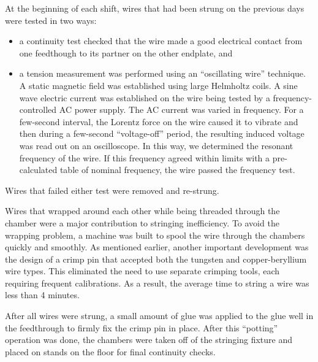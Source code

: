 At the beginning of each shift, wires that had been strung on the previous days
were tested in two ways:
\begin{itemize}
\item a continuity test checked that the wire made a good electrical contact
from one feedthough to its partner on the other endplate, and
\item a tension measurement was performed using an ``oscillating wire'' technique.
A static magnetic field was established using large Helmholtz coils.  A sine
wave electric current was established on the wire being tested by a frequency-controlled 
AC power supply.  The AC current was varied in frequency.  For a 
few-second interval, the Lorentz force on the wire caused it to vibrate and
then during a few-second ``voltage-off'' period, the resulting induced voltage
was read out on an oscilloscope.  In this way, we determined the resonant frequency
of the wire.  If this frequency agreed within limits with a pre-calculated
table of nominal frequency, the wire passed the frequency test.
\end{itemize}
Wires that failed either test were removed and re-strung.

Wires that wrapped around each other while being threaded through the chamber 
were a major contribution to stringing inefficiency. To avoid the wrapping
problem, a machine was built to spool the wire through the chambers quickly and smoothly.
As mentioned earlier, another important development was the design of a crimp pin 
that accepted both the tungsten and copper-beryllium wire types.    This 
eliminated the need to use separate crimping tools, each requiring frequent 
calibrations.  
As a result, the average time to string a wire was less than 4 minutes.

After all wires were strung,
a small amount of glue was applied to the glue well
in the feedthrough to firmly fix the crimp pin in place.  After this ``potting''
operation was done, the chambers were taken off of the stringing fixture and
placed on stands on the floor for final continuity checks.








